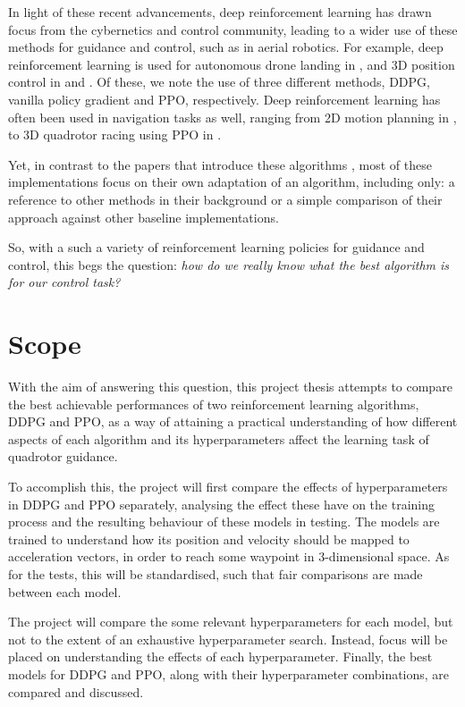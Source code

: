 In light of these recent advancements, deep reinforcement learning has drawn focus from the cybernetics and control community, leading to a wider use of these methods for guidance and control, 
such as in aerial robotics. For example, deep reinforcement learning is used for autonomous drone landing in \cite{RodriguezRamos2019ADR}, and 3D position control in  \cite{ControlofQuadrotorRL} and \cite{PPOQuadrotor}. Of these, we note the use of three different methods, DDPG, vanilla policy gradient and PPO, respectively. 
Deep reinforcement learning has often been used in navigation tasks as well, ranging from 2D motion planning in \cite{Roy2002MotionPT}, to 3D quadrotor racing using PPO in \cite{song2021droneRacing}. 

Yet, in contrast to the papers that introduce these algorithms \cite{DDPG, PPO}, most of these implementations focus on their own adaptation of an algorithm, including only: a reference to other methods in their background or a simple comparison of their approach against other baseline implementations.

So, with a such a variety of reinforcement learning policies for guidance and control, this begs the question: \textit{how do we really know what the best algorithm is for our control task?} 


\section{Scope}

With the aim of answering this question, this project thesis attempts to compare the best achievable performances of two reinforcement learning algorithms, DDPG and PPO, as a way of attaining a practical understanding of how different aspects of each algorithm and its hyperparameters affect the learning task of quadrotor guidance.

To accomplish this, the project will first compare the effects of hyperparameters in DDPG and PPO separately, analysing the effect these have on the training process and the resulting behaviour of these models in testing. The models are trained to understand how its position and velocity should be mapped to acceleration vectors, in order to reach some waypoint in 3-dimensional space. As for the tests, this will be standardised, such that fair comparisons are made between each model.

The project will compare the some relevant
hyperparameters for each model, but not to the extent of an exhaustive hyperparameter search. Instead, focus will be placed on understanding the effects of each hyperparameter. Finally, the best models for DDPG and PPO, along with their hyperparameter combinations, are compared and discussed.

